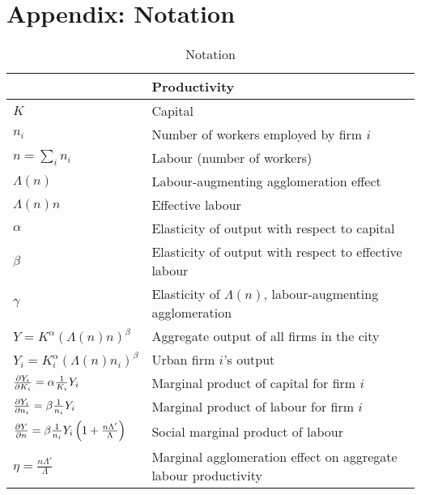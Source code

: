 \chapter*{Appendix: Notation}


\begin{center}
\begin{longtable}{lp{10cm}}
\caption{Notation}\\\hline
		&\textbf{Productivity}\\ \hline
$K$  &  Capital\\
$n_i$  &  Number of workers employed by firm $i$\\
$n=\sum_i n_i$  &  Labour (number of workers)\\
$\Lambda(n)$  &  Labour-augmenting agglomeration effect \\
$\Lambda(n)n$  &  Effective labour \\
$\alpha$  &  Elasticity of output with respect to capital\\
$\beta$  &  Elasticity of output with respect to effective labour\\
$\gamma$  &  Elasticity of $\Lambda(n)$, labour-augmenting agglomeration\\
$Y=K^{\alpha }(\Lambda(n)n)^{\beta }$  &  Aggregate output of all firms in the city\\
$Y_i=K_i^{\alpha }(\Lambda(n)n_i)^{\beta }$  &  Urban firm $i$'s output\\
$\frac{\partial Y_i}{\partial K_i}	=\alpha \frac{1}{K_i} Y_i $  & Marginal product of capital for firm $i$
\\
$\frac{\partial Y_i}{\partial n_i}	=  \beta\frac{1}{n_i} Y_i $  &  
Marginal product of labour for firm $i$\\
$\frac{\partial Y}{\partial n}=\beta\frac{1}{n_i} Y_i  \left( 1+ \frac{n\Lambda'}{\Lambda} \right) $  &  Social marginal product of labour\\
$\eta=\frac{n\Lambda'}{\Lambda}$  &   Marginal agglomeration effect on aggregate labour productivity\\

\end{longtable}
\end{center}
